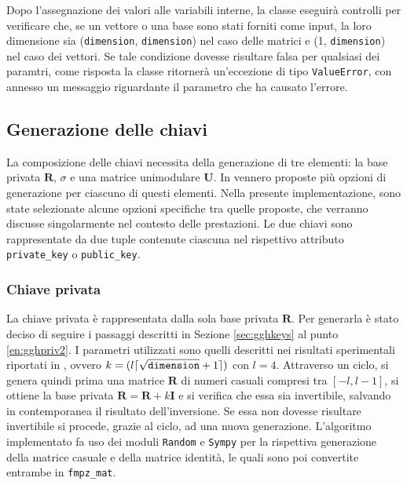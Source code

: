 Dopo l'assegnazione dei valori alle variabili interne, la classe eseguirà controlli 
per verificare che, se un vettore o una base sono stati forniti come input, la loro 
dimensione sia (\texttt{dimension}, \texttt{dimension})
nel caso delle matrici e (1, \texttt{dimension}) nel caso dei vettori. Se tale condizione
dovesse risultare falsa per qualsiasi dei paramtri, come risposta la classe ritornerà
un'eccezione di tipo \texttt{ValueError}, con annesso un messaggio riguardante il parametro
che ha causato l'errore.

\subsection{Generazione delle chiavi}

La composizione delle chiavi necessita della generazione di tre elementi: 
la base privata $\mathbf{R}$, $\sigma$ e una matrice unimodulare $\mathbf{U}$. 
In \cite{GGH97} vennero proposte più opzioni di generazione
per ciascuno di questi elementi. Nella presente implementazione, sono state selezionate 
alcune opzioni specifiche tra quelle proposte, che verranno discusse singolarmente nel contesto
delle prestazioni. Le due chiavi sono rappresentate da due tuple contenute ciascuna
nel rispettivo attributo \texttt{private\_key} o \texttt{public\_key}.

\subsubsection{Chiave privata}
\label{sec:gghimplementationprivkey}
La chiave privata è rappresentata dalla sola base privata $\mathbf{R}$.
Per generarla è stato deciso di seguire i passaggi descritti 
in Sezione \ref{sec:gghkeys} al punto \ref{en:gghpriv2}. I parametri utilizzati sono
quelli descritti nei risultati sperimentali riportati in \cite{GGH97}, ovvero 
$k = (l \lceil \sqrt{\text{\texttt{dimension}}} + 1 \rceil)$ con $l = 4$. 
Attraverso un ciclo, si genera quindi prima una matrice $\mathbf{R}$ di numeri casuali 
compresi tra $[-l, l-1]$, si ottiene la base privata $\mathbf{R} = \mathbf{R}+k\mathbf{I}$ 
e si verifica che essa sia invertibile, salvando in contemporanea il risultato dell'inversione.
Se essa non dovesse risultare invertibile si procede, grazie al ciclo, ad una nuova generazione. 
L'algoritmo implementato fa uso dei moduli \texttt{Random} e \texttt{Sympy} per la rispettiva
generazione della matrice casuale e della matrice identità, le quali sono poi convertite
entrambe in \texttt{fmpz\_mat}. 

